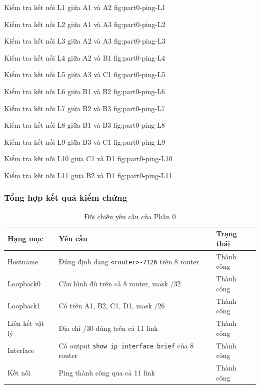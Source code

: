 {Kiểm tra kết nối L1 giữa A1 và A2}
{fig:part0-ping-L1}

{Kiểm tra kết nối L2 giữa A1 và A3}
{fig:part0-ping-L2}

{Kiểm tra kết nối L3 giữa A2 và A3}
{fig:part0-ping-L3}

{Kiểm tra kết nối L4 giữa A2 và B1}
{fig:part0-ping-L4}

{Kiểm tra kết nối L5 giữa A3 và C1}
{fig:part0-ping-L5}

{Kiểm tra kết nối L6 giữa B1 và B2}
{fig:part0-ping-L6}

{Kiểm tra kết nối L7 giữa B2 và B3}
{fig:part0-ping-L7}

{Kiểm tra kết nối L8 giữa B1 và B3}
{fig:part0-ping-L8}

{Kiểm tra kết nối L9 giữa B3 và C1}
{fig:part0-ping-L9}

{Kiểm tra kết nối L10 giữa C1 và D1}
{fig:part0-ping-L10}

{Kiểm tra kết nối L11 giữa B2 và D1}
{fig:part0-ping-L11}

\subsubsection{Tổng hợp kết quả kiểm chứng}

\begin{table}[H]
\centering
\caption{Đối chiếu yêu cầu của Phần 0}
\label{tab:part0-summary}
\small
\renewcommand{\arraystretch}{1.3}
\begin{tabularx}{\textwidth}{l X l}
\toprule
\textbf{Hạng mục} & \textbf{Yêu cầu} & \textbf{Trạng thái} \\
\midrule
Hostname & Đúng định dạng \texttt{<router>-7126} trên 8 router & Thành công \\
Loopback0 & Cấu hình đủ trên cả 8 router, mask /32 & Thành công \\
Loopback1 & Có trên A1, B2, C1, D1, mask /26 & Thành công \\
Liên kết vật lý & Địa chỉ /30 đúng trên cả 11 link & Thành công \\
Interface & Có output \texttt{show ip interface brief} của 8 router & Thành công \\
Kết nối & Ping thành công qua cả 11 link & Thành công \\
\bottomrule
\end{tabularx}
\end{table}

\newpage
